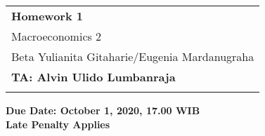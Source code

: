 \documentclass[letter,11pt]{article}
\begin{document}
\thispagestyle{empty} %
\begin{tabular}{p{17cm}} %
{\large \bf Homework 1} \\
Macroeconomics 2 \\ Beta Yulianita Gitaharie/Eugenia Mardanugraha  \\ {\bf{TA: Alvin Ulido Lumbanraja}}\\
\hline %
\\
\end{tabular} %

\begin{center}
\textbf{Due Date: October 1, 2020, 17.00 WIB \\ Late Penalty Applies}
\end{center}
\end{document}
